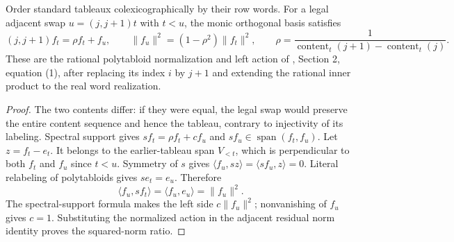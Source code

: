 \begin{theorem}
\label{lem:monic-seminormal}
\leanok
Order standard tableaux colexicographically by their row words.
For a legal adjacent swap $u=(j,j+1)t$ with $t<u$, the monic
orthogonal basis satisfies
\[
 (j,j+1)f_t=\rho f_t+f_u,\qquad
 \|f_u\|^2=(1-\rho^2)\|f_t\|^2,\qquad
 \rho=\frac{1}{\operatorname{content}_t(j+1)-\operatorname{content}_t(j)}.
\]
These are the rational polytabloid normalization and left action of
\cite{ryom-hansen-seminormal}, Section 2, equation (1), after replacing
its index $i$ by $j+1$ and extending the rational inner product to
the real word realization.
\end{theorem}
\begin{proof}
The two contents differ: if they were equal, the legal swap would
preserve the entire content sequence and hence the tableau, contrary
to injectivity of its labeling. Spectral support gives
$sf_t=\rho f_t+c f_u$ and $sf_u\in\operatorname{span}(f_t,f_u)$.
Let $z=f_t-e_t$. It belongs to the earlier-tableau span $V_{<t}$,
which is perpendicular to both $f_t$ and $f_u$ since $t<u$.
Symmetry of $s$ gives $\langle f_u,sz\rangle=\langle sf_u,z\rangle=0$.
Literal relabeling of polytabloids gives $se_t=e_u$. Therefore
\[
 \langle f_u,sf_t\rangle=\langle f_u,e_u\rangle=\|f_u\|^2.
\]
The spectral-support formula makes the left side $c\|f_u\|^2$;
nonvanishing of $f_u$ gives $c=1$. Substituting the normalized action
in the adjacent residual norm identity proves the squared-norm ratio.
\end{proof}

